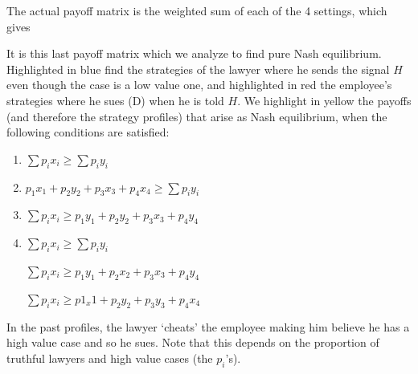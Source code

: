 \documentclass[10pt]{article}
\begin{document}
The actual payoff matrix is the weighted sum of each of the 4 settings, which gives

\begin{table}[H]
\centering
        {}
   \caption*{Payoff Matrix: Expected payoff matrix}
\end{table}

It is this last payoff matrix which we analyze to find pure Nash equilibrium. Highlighted in blue find the strategies of the lawyer where he sends the signal $H$ even though the case is a low value one, and highlighted in red the employee's strategies where he sues (D) when he is told $H$. We highlight in yellow the payoffs (and therefore the strategy profiles) that arise as Nash equilibrium, when the following conditions are satisfied:

\begin{enumerate}
    \item [$(HHHH, DD)$] $\sum p_i x_i\geq \sum p_i y_i $
    \item [$(HLHH, DN)$] $p_1x_1+p_2y_2+p_3x_3+p_4x_4\geq \sum p_iy_i$
    \item [$(HHLH, DD)$] $\sum p_i x_i \geq p_1y_1+p_2y_2+p_3x_3+p_4y_4$
    \item [$(HLLH, DD)$] $\sum p_i x_i \geq \sum p_i y_i$ 
    
    $\sum p_i x_i \geq  p_1y_1+p_2x_2+p_3x_3+p_4y_4$ 
    
    $\sum p_i x_i \geq p1_x1+p_2y_2+p_3y_3+p_4x_4$ 
\end{enumerate}


In the past profiles, the lawyer `cheats' the employee making him believe he has a high value case and so he sues. Note that this depends on the proportion of truthful lawyers and high value cases (the $p_i$'s). \\


%
%
%
\end{document}
